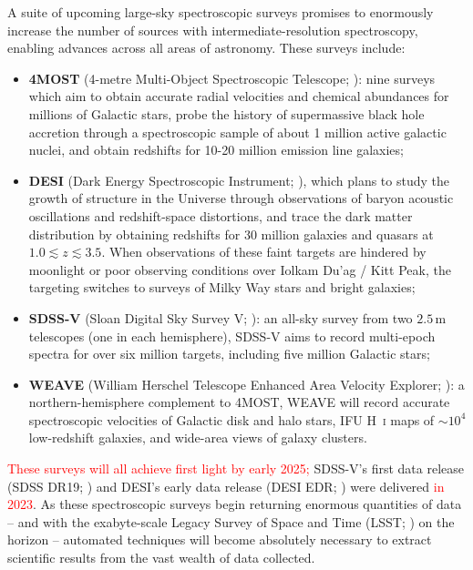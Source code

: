 \documentclass[fleqn,usenatbib]{mnras}
\newcommand{\red}[1]{\textcolor{red}{#1}}
\begin{document}
A suite of upcoming large-sky spectroscopic surveys promises to enormously increase the number of sources with intermediate-resolution spectroscopy, enabling advances across all areas of astronomy.
These surveys include:
\begin{itemize}
\item
\textbf{4MOST}
(4-metre Multi-Object Spectroscopic Telescope; \citealt{4most}): nine surveys which aim to obtain accurate radial velocities and chemical abundances for millions of Galactic stars, probe the history of supermassive black hole accretion through a spectroscopic sample of about 1 million active galactic nuclei, and obtain redshifts for 10-20 million emission line galaxies;
\item
\textbf{DESI}
(Dark Energy Spectroscopic Instrument; \citealt{desii, desiii}), which plans to study the growth of structure in the Universe through observations of baryon acoustic oscillations and redshift-space distortions, and trace the dark matter distribution by obtaining redshifts for 30 million galaxies and quasars at $1.0\lesssim z \lesssim 3.5$.
When observations of these faint targets are hindered by moonlight or poor observing conditions over Iolkam Du'ag / Kitt Peak, the targeting switches to surveys of Milky Way stars and bright galaxies;
\item
\textbf{SDSS-V}
(Sloan Digital Sky Survey V; \citealt{sdssv}):
an all-sky survey from two $2.5\,\text{m}$ telescopes (one in each hemisphere), SDSS-V aims to record multi-epoch spectra for over six million targets, including five million Galactic stars;
\item
\textbf{WEAVE}
(William Herschel Telescope Enhanced Area Velocity Explorer; \citealt{weave}): a northern-hemisphere complement to 4MOST, WEAVE will record accurate spectroscopic velocities of Galactic disk and halo stars, IFU H~\textsc{i} maps of $\sim10^4$ low-redshift galaxies, and wide-area views of galaxy clusters.
\end{itemize}
\red{These surveys will all achieve first light by early 2025;} SDSS-V's first data release (SDSS DR19; \citealt{sdssdr19}) and DESI's early data release (DESI EDR; \citealt{desiedr}) were delivered \red{in 2023}.
As these spectroscopic surveys begin returning enormous quantities of data -- and with the exabyte-scale Legacy Survey of Space and Time (LSST; \citealt{lsst}) on the horizon -- automated techniques will become absolutely necessary to extract scientific results from the vast wealth of data collected.
\end{document}
